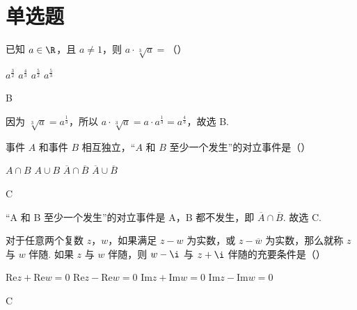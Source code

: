 \documentclass[UTF8,a4paper,oneside,11pt]{ctexbook}
\begin{document}
\section{单选题}

\begin{problem}
已知 \( a\in\R \)，且 \( a\neq 1 \)，则 \( a\cdot \sqrt[3]{a}=\)（\quad）

\choices
    {\(a^{\frac{3}{2}}\)}
    {\(a^{\frac{4}{3}}\)}
    {\(a^{\frac{5}{2}}\)}
    {\(a^{\frac{5}{3}}\)}
\end{problem}

\begin{answer}
B
\end{answer}

\begin{solution}
因为 \( \sqrt[3]{a}=a^{\frac{1}{3}} \)，所以 \( a\cdot \sqrt[3]{a}=a\cdot a^{\frac{1}{3}}=a^{\frac{4}{3}} \)，故选 B.
\end{solution}

\begin{problem}
事件 \(A\) 和事件 \(B\) 相互独立，“\(A\) 和 \(B\) 至少一个发生”的对立事件是（\quad）

\choices
    {\( A\cap B \)}
    {\( A\cup B \)}
    {\( \overline{A}\cap \overline{B} \)}
    {\( \overline{A}\cup \overline{B} \)}
\end{problem}

\begin{answer}
C
\end{answer}

\begin{solution}
“A 和 B 至少一个发生”的对立事件是 A，B 都不发生，即 \( \overline{A}\cap \overline{B} \). 故选 C.
\end{solution}

\begin{problem}
对于任意两个复数 \( z \)，\( w \)，如果满足 \( z-w \) 为实数，或 \( z-\overline{w} \) 为实数，那么就称 \( z \) 与 \( w \) 伴随. 如果 \( z \) 与 \( w \) 伴随，则 \( w-\i \) 与 \( z+\i \) 伴随的充要条件是（\quad）

\choices
    {\( \mathrm{Re} z+\mathrm{Re} w=0 \)}
    {\( \mathrm{Re} z-\mathrm{Re} w=0 \)}
    {\( \mathrm{Im} z+\mathrm{Im} w=0 \)}
    {\( \mathrm{Im} z-\mathrm{Im} w=0 \)}
\end{problem}

\begin{answer}
C
\end{answer}
\end{document}
